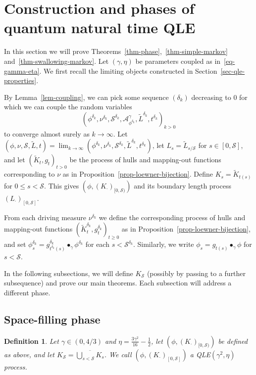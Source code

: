 \documentclass[a4paper]{article}
\numberwithin{equation}{section}
\newcommand{\ol}{\overline}
\newcommand{\cA}{\mathcal{A}}
\newcommand{\qduration}{\mathcal{S}}
\newtheorem{definition}[theorem]{Definition}
\theoremstyle{remark}
\numberwithin{equation}{section}
\begin{document}
\section{Construction and phases of quantum natural time QLE}
\label{sec-phases}
In this section we will prove Theorems~\ref{thm-phase},~\ref{thm-simple-markov} and~\ref{thm-swallowing-markov}. Let $(\gamma, \eta)$ be parameters coupled as in~\eqref{eq-gamma-eta}. We first recall the limiting objects constructed in Section~\ref{sec-qle-properties}.

By Lemma~\ref{lem-coupling}, we can pick some sequence $(\delta_k)$ decreasing to 0 for which we can couple the random variables    $$(\phi^{\delta_k},  \nu^{\delta_k}, \qduration^{\delta_k}, \cA^\gamma_{\phi^{\delta_k}}, \tilde L^{\delta_k}, t^{\delta_k})_{k > 0}$$
    to converge almost surely as $k \to \infty$. 
    Let $(\phi, \nu, \qduration, \tilde L, t) = \lim_{k \to \infty}(\phi^{\delta_k}, \nu^{\delta_k}, \qduration^{\delta_k}, \tilde L^{\delta_k}, t^{\delta_k})$, let $L_s = \tilde L_{s/\qduration}$ for $s \in [0,\qduration]$, and let $(\tilde K_t, g_t)_{t >0}$ be the process of hulls and mapping-out functions corresponding to $\nu$ as in Proposition~\ref{prop-loewner-bijection}. Define $K_s = \tilde K_{t(s)}$ for $0 \leq s < \qduration$. This gives $(\phi, (K_\cdot)_{[0,\qduration)})$ and its boundary length process $(L_\cdot)_{[0,\qduration]}$.

From each driving measure $\nu^{\delta_k}$ we define the corresponding process of hulls and mapping-out functions $(\tilde K_t^{\delta_k}, g_t^{\delta_k})_{t \geq 0}$ as in Proposition~\ref{prop-loewner-bijection}, and set $\phi^{\delta_k}_s = g^{\delta_k}_{t^{\delta_k}(s)} \bullet_\gamma \phi^{\delta_k}$ for each $s < \qduration^{\delta_k}$. Similarly, we write $\phi_s = g_{t(s)} \bullet_\gamma \phi$ for $s < \qduration$. 

In the following subsections, we will define $K_\qduration$ (possibly by passing to a further subsequence) and prove our main theorems. Each subsection will address a different phase. 

\subsection{Space-filling phase}

\begin{definition}\label{def-qle-sf}
    Let $\gamma \in (0,4/3)$ and $\eta = \frac{3\gamma^2}{16} - \frac12$, let $(\phi, (K_\cdot)_{[0,\qduration)})$ be defined as above, and let $K_\qduration = \ol{\bigcup_{s < \qduration} K_s}$. We call $(\phi, (K_\cdot)_{[0,\qduration]})$ a QLE$(\gamma^2, \eta)$ process. 
\end{definition}
\end{document}
